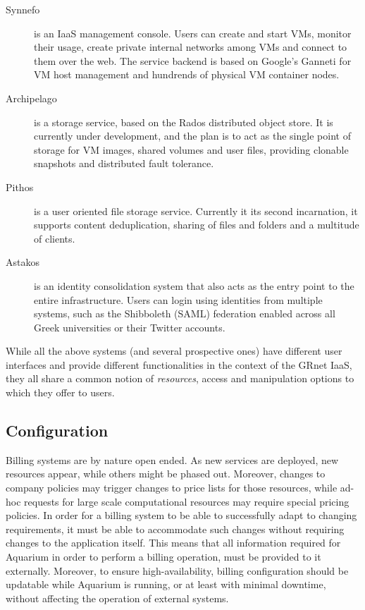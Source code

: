\documentclass[preprint,10pt]{sigplanconf}
\begin{document}
\begin{description}

    \item[Synnefo] is an IaaS management console. Users can create and start
        VMs, monitor their usage, create private internal networks among VMs
        and connect to them over the web. The service backend is based on
        Google's Ganneti for VM host management and hundrends of physical
        VM container nodes.

    \item[Archipelago] is a storage service, based on the Rados
        distributed object store. It is currently under development, and the
        plan is to act as the single point of storage for VM images, shared
        volumes and user files, providing clonable snapshots and distributed
        fault tolerance.
    
    \item[Pithos] is a user oriented file storage service. Currently it its
        second incarnation, it supports content deduplication, sharing of files
        and folders and a multitude of clients.

    \item[Astakos] is an identity consolidation system that also acts as the
        entry point to the entire infrastructure. Users can login using 
        identities from multiple systems, such as the Shibboleth (SAML) 
        federation enabled across all Greek universities or their Twitter 
        accounts.

\end{description}

While all the above systems (and several prospective ones) have different 
user interfaces and provide different functionalities in the context of
the GRnet IaaS, they all share a common notion of \emph{resources}, access
and manipulation options to which they offer to users. 


\subsection{Configuration}

Billing systems are by nature open ended. As new services are deployed, new
resources appear, while others might be phased out.  Moreover, changes to
company policies may trigger changes to price lists for those resources, while
ad-hoc requests for large scale computational resources may require special
pricing policies. In order for a billing system to be able to successfully
adapt to changing requirements, it must be able to accommodate such changes
without requiring changes to the application itself. This means that all
information required for Aquarium in order to perform a billing operation,
must be provided to it externally. Moreover, to ensure high-availability,
billing configuration should be updatable while Aquarium is running, or at
least with minimal downtime, without affecting the operation of external
systems.
\end{document}
